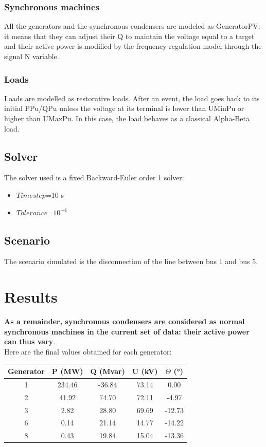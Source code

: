 \documentclass[a4paper, 12pt]{report}
\begin{document}
\subsubsection{Synchronous machines}

All the generators and the synchronous condensers are modeled as GeneratorPV: it means that they can adjust their Q to maintain the voltage equal to a target and their active power is modified by the frequency regulation model through the signal N variable.

\subsubsection{Loads}

Loads are modelled as restorative loads. After an event, the load goes back to its initial PPu/QPu unless the voltage at its terminal is lower than UMinPu or higher than UMaxPu. In this case, the load behaves as a classical Alpha-Beta load.

\subsection{Solver}
The solver used is a fixed Backward-Euler order 1 solver:
\begin{itemize}
\item $Time step$=10 s
\item $Tolerance$=$10^{-4}$
\end{itemize}

\subsection{Scenario}
The scenario simulated is the disconnection of the line between bus 1 and bus 5.

\newpage
\section{Results}

\textbf{As a remainder, synchronous condensers are considered as normal synchronous machines in the current set of data: their active power can thus vary}. \\

Here are the final values obtained for each generator:

\begin{center}
\begin{tabular}{|c|c|c|c|c|}
  \hline
  Generator & P (MW) & Q (Mvar) & U (kV) & $\Theta$ (°) \\
  \hline
  1 & 234.46 & -36.84 & 73.14 & 0.00\\
  2 & 41.92 & 74.70 & 72.11 & -4.97\\
  3 & 2.82 & 28.80 & 69.69 & -12.73\\
  6 & 0.14 & 21.14 & 14.77 & -14.22\\
  8 & 0.43 & 19.84 & 15.04 & -13.36\\
  \hline
\end{tabular}
\end{center}
\end{document}

